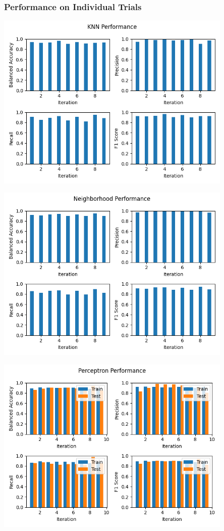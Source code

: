 \documentclass[a4paper, 11pt, titlepage]{article}
\begin{document}
  \subsubsection{Performance on Individual Trials}
  \par \includegraphics[width=0.85\textwidth]{images/knn_performance.png}
  \par \includegraphics[width=0.85\textwidth]{images/neighborhood_performance.png}
  \par \includegraphics[width=0.85\textwidth]{images/perceptron_performance.png}
\end{document}
